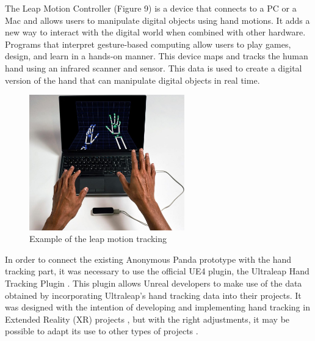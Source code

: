 The Leap Motion Controller (Figure 9) is a device that connects to a PC or a Mac and allows users to manipulate digital objects using hand motions. It adds a new way to interact with the digital world when combined with other hardware. Programs that interpret gesture-based computing allow users to play games, design, and learn in a hands-on manner. This device maps and tracks the human hand using an infrared scanner and sensor. This data is used to create a digital version of the hand that can manipulate digital objects in real time.

\begin{figure}[h!]
\includegraphics[width=0.6\textwidth]{figures/leapMotion.jpg}
\centering
\caption{Example of the leap motion tracking}
\end{figure}

In order to connect the existing Anonymous Panda prototype with the hand tracking part, it was necessary to use the official UE4 plugin, the Ultraleap Hand Tracking Plugin \cite{ULT}. This plugin allows Unreal developers to make use of the data obtained by incorporating Ultraleap's hand tracking data into their projects. It was designed with the intention of developing and implementing hand tracking in Extended Reality (XR) projects \cite{XR}, but with the right adjustments, it may be possible to adapt its use to other types of projects \cite{ULTG}.




